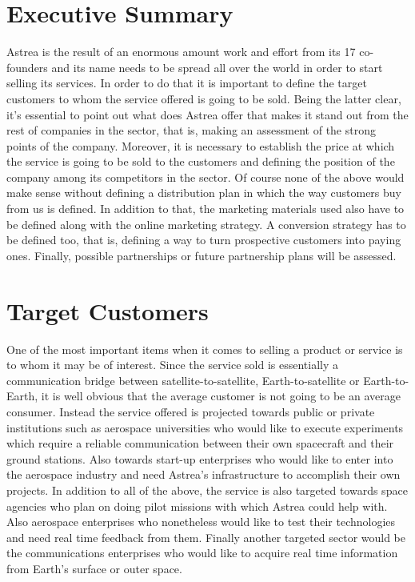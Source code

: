 \section{Executive Summary}
Astrea is the result of an enormous amount work and effort from its 17 co-founders and its name needs to be spread all over the world in order to start selling its services. In order to do that it is important to define the target customers to whom the service offered is going to be sold. Being the latter clear, it's essential to point out what does Astrea offer that makes it stand out from the rest of companies in the sector, that is, making an assessment of the strong points of the company. Moreover, it is necessary to establish the price at which the service is going to be sold to the customers and defining the position of the company among its competitors in the sector.
\newline\newline
Of course none of the above would make sense without defining a distribution plan in which the way customers buy from us is defined. In addition to that, the marketing materials used also have to be defined along with the online marketing strategy.
\newline\newline
A conversion strategy has to be defined too, that is, defining a way to turn prospective customers into paying ones. Finally, possible partnerships or future partnership plans will be assessed.
\section{Target Customers}
One of the most important items when it comes to selling a product or service is to whom it may be of interest. Since the service sold is essentially a communication bridge between satellite-to-satellite, Earth-to-satellite or Earth-to-Earth, it is well obvious that the average customer is not going to be an average consumer.
\newline\newline
Instead the service offered is projected towards public or private institutions such as aerospace universities who would like to execute experiments which require a reliable communication between their own spacecraft and their ground stations. Also towards start-up enterprises who would like to enter into the aerospace industry and need Astrea's infrastructure to accomplish their own projects.
\newline\newline
In addition to all of the above, the service is also targeted towards space agencies who plan on doing pilot missions with which Astrea could help with. Also aerospace enterprises who nonetheless would like to test their technologies and need real time feedback from them. Finally another targeted sector would be the communications enterprises who would like to acquire real time information from Earth's surface or outer space.
